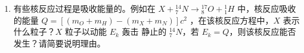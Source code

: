 \begin{enumerate}
\begin{enumerate}
	


\item 
有些核反应过程是吸收能量的。例如在 $X+{ }_{7}^{14} N \rightarrow{ }_{8}^{17} O+{ }_{1}^{1} H$ 中，核反应吸收的能量
$Q=\left[\left(m_{O}+m_{H}\right)-\left(m_{X}+m_{N}\right)\right] c^{2}$
，在该核反应方程中，$ X $ 表示什么粒子？$ X $ 粒子以动能 $ E_{k} $ 轰击
静止的 $ ^{14}_{7} N $，若 $ E_{k} =Q $，则该核反应能否发生？请简要说明理由。






\end{enumerate}






	
	
	
\end{enumerate}

